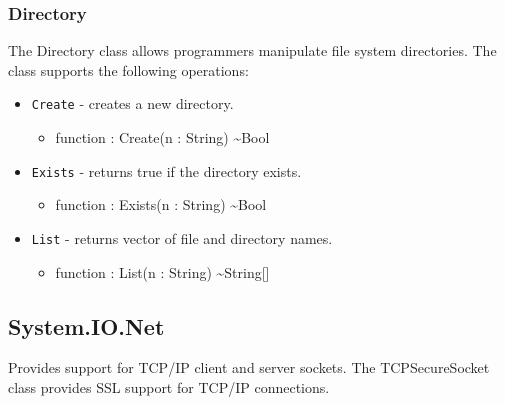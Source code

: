 \documentclass[11pt]{article}
\begin{document}
\subsubsection{Directory}
The Directory class allows programmers manipulate file system
directories.  The class supports the following operations:
\begin{itemize}
\item \texttt{Create} - creates a new directory.
  \begin{itemize}
  \item function : Create(n : String) \textasciitilde Bool
  \end{itemize}
\item \texttt{Exists} - returns true if the directory exists.
  \begin{itemize}
  \item function : Exists(n : String) \textasciitilde Bool
  \end{itemize}
\item \texttt{List} - returns vector of file and directory names.
  \begin{itemize}
  \item function : List(n : String) \textasciitilde String[]
  \end{itemize}
\end{itemize}

\subsection{System.IO.Net}
Provides support for TCP/IP client and server sockets.  The
TCPSecureSocket class provides SSL support for TCP/IP connections.
\end{document}
